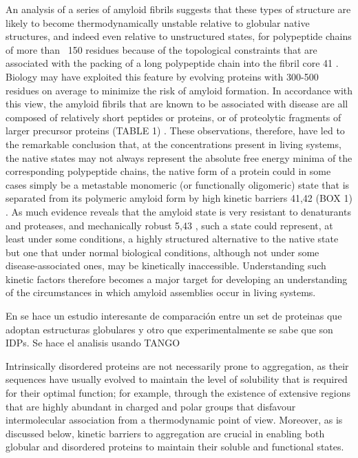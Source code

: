 An analysis of a series of amyloid fibrils suggests that
these types of structure are likely to become thermodynamically unstable relative to globular native structures, and indeed even relative to unstructured states, for
polypeptide chains of more than ~150 residues because
of the topological constraints that are associated with the
packing of a long polypeptide chain into the fibril core 41 .
Biology may have exploited this feature by evolving proteins with 300-500 residues on average to minimize the
risk of amyloid formation. In accordance with this view,
the amyloid fibrils that are known to be associated with
disease are all composed of relatively short peptides or
proteins, or of proteolytic fragments of larger precursor
proteins (TABLE 1) .
These observations, therefore, have led to the remarkable conclusion that,
at the concentrations present in living systems,
the native states may not always represent
the absolute free energy minima of the corresponding polypeptide chains, the native form of a protein could in some cases simply be a metastable monomeric
(or functionally oligomeric) state that is separated from
its polymeric amyloid form by high kinetic barriers 41,42
(BOX 1) . As much evidence reveals that the amyloid state is
very resistant to denaturants and proteases, and mechanically robust 5,43 , such a state could represent, at least under
some conditions, a highly structured alternative to the
native state but one that under normal biological conditions, although not under some disease-associated ones,
may be kinetically inaccessible. Understanding such
kinetic factors therefore becomes a major target for developing an understanding of the circumstances in which
amyloid assemblies occur in living systems.






En \cite{linding2004comparative} se hace un estudio interesante de comparación entre un set de proteinas que adoptan estructuras globulares y otro que experimentalmente se sabe que son IDPs.
Se hace el analisis usando TANGO

Intrinsically disordered proteins are not necessarily prone to aggregation, as their sequences have usually evolved to maintain the level
of solubility that is required for their optimal function; for example, through the existence of extensive regions that are highly abundant in charged and polar groups
that disfavour intermolecular association from a thermodynamic point of view. 
Moreover, as is discussed below, kinetic barriers to aggregation are crucial in enabling both globular and disordered proteins to maintain their soluble and functional states.

